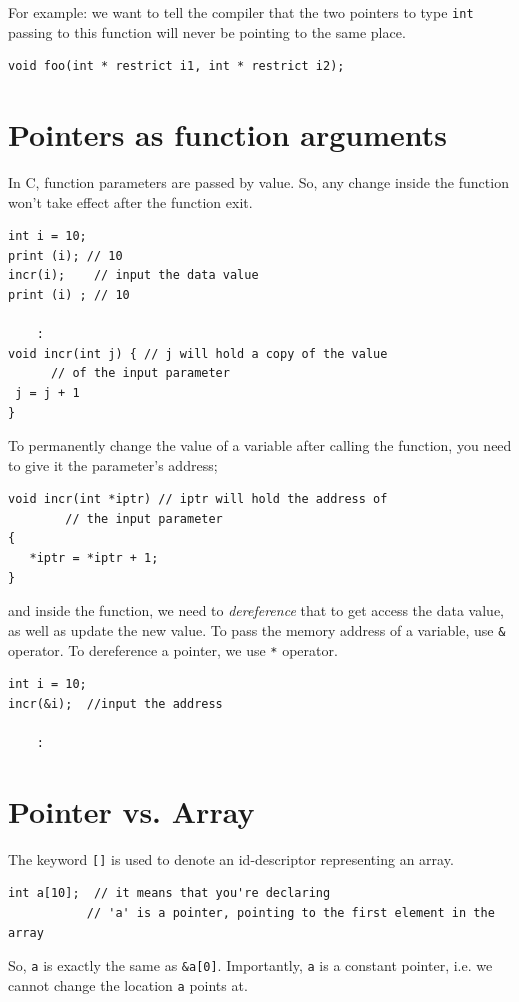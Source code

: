 For example: we want to tell the compiler that the two pointers to type
\verb!int! passing to this function will never be pointing to the same place.
\begin{verbatim}
void foo(int * restrict i1, int * restrict i2);
\end{verbatim}


\section{Pointers as function arguments}
\label{sec:pointers-as-function}

In C, function parameters are passed by value. So, any change inside
the function won't take effect after the function exit. 
\begin{lstlisting}
int i = 10;
print (i); // 10
incr(i);    // input the data value
print (i) ; // 10

    :
void incr(int j) { // j will hold a copy of the value
      // of the input parameter
 j = j + 1
}
\end{lstlisting}

To permanently change the value of a variable after calling the function, you
need to give it the parameter's address;
\begin{lstlisting}
void incr(int *iptr) // iptr will hold the address of 
        // the input parameter
{
   *iptr = *iptr + 1;
}
\end{lstlisting}
and inside the function, we need to {\it dereference} that to get access the
data value, as well as update the new value. To pass the memory address of a
variable, use \verb!&! operator. To dereference a pointer, we use \verb!*! operator.

\begin{lstlisting}
int i = 10;
incr(&i);  //input the address

    :
\end{lstlisting}


\section{Pointer vs. Array}
\label{sec:pointer_array}
\label{sec:array-and-pointer}

The keyword \verb![]! is used to denote an id-descriptor representing an array.
\begin{verbatim}
int a[10];  // it means that you're declaring 
           // 'a' is a pointer, pointing to the first element in the array
\end{verbatim}
So, \verb!a! is exactly the same as \verb!&a[0]!. Importantly, \verb!a! is a
constant pointer, i.e. we cannot change the location \verb!a! points at.


